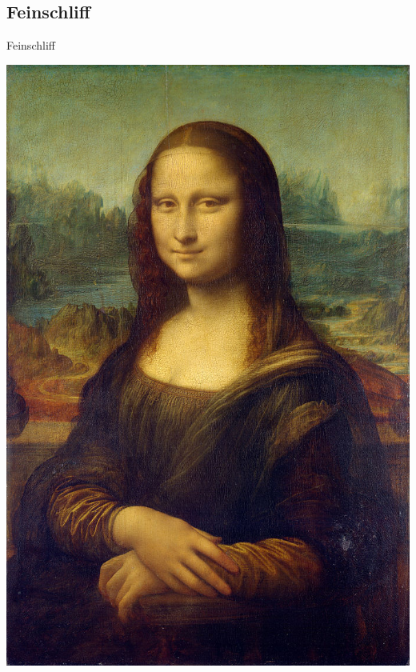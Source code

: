 \documentclass[19pt]{beamer}
\begin{document}
\subsection{Feinschliff}
\begin{frame}{Feinschliff}
\begin{center}
\includegraphics[scale=0.2]{resources/review.jpg}
\end{center}
\end{frame}

\end{document}
